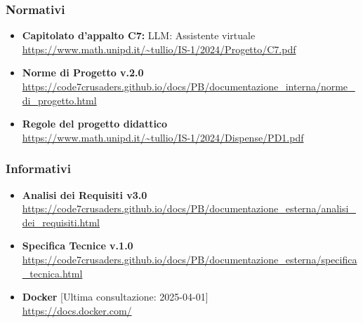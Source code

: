     \subsubsection{Normativi}
        \begin{itemize}
            \item \textbf{Capitolato d'appalto C7:} LLM: Assistente virtuale \\ \url{https://www.math.unipd.it/~tullio/IS-1/2024/Progetto/C7.pdf}
            \item \textbf{Norme di Progetto v.2.0} \\ \url{https://code7crusaders.github.io/docs/PB/documentazione_interna/norme_di_progetto.html}
            \item \textbf{Regole del progetto didattico} \\ \url{https://www.math.unipd.it/~tullio/IS-1/2024/Dispense/PD1.pdf}
        \end{itemize}
    \subsubsection{Informativi}
        \begin{itemize}
            \item \textbf{Analisi dei Requisiti v3.0} \\ \url{https://code7crusaders.github.io/docs/PB/documentazione_esterna/analisi_dei_requisiti.html}
            \item \textbf{Specifica Tecnice v.1.0} \\ \url{https://code7crusaders.github.io/docs/PB/documentazione_esterna/specifica_tecnica.html}
            \item \textbf{Docker} [Ultima consultazione: 2025-04-01] \\ \url{https://docs.docker.com/} 
        \end{itemize}